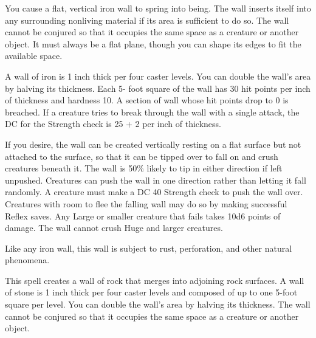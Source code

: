 \begin{multicols}{2}
\begin{small}
\noindent You cause a flat, vertical iron wall to spring into being. The wall inserts itself into any surrounding nonliving material if its area is sufficient to do so. The wall cannot be conjured so that it occupies the same space as a creature or another object. It must always be a flat plane, though you can shape its edges to fit the available space.

\smallskip\noindent A wall of iron is 1 inch thick per four caster levels. You can double the wall's area by halving its thickness. Each 5- foot square of the wall has 30 hit points per inch of thickness and hardness 10. A section of wall whose hit points drop to 0 is breached. If a creature tries to break through the wall with a single attack, the DC for the Strength check is 25 + 2 per inch of thickness.

\smallskip\noindent If you desire, the wall can be created vertically resting on a flat surface but not attached to the surface, so that it can be tipped over to fall on and crush creatures beneath it. The wall is 50\% likely to tip in either direction if left unpushed. Creatures can push the wall in one direction rather than letting it fall randomly. A creature must make a DC 40 Strength check to push the wall over. Creatures with room to flee the falling wall may do so by making successful Reflex saves. Any Large or smaller creature that fails takes 10d6 points of damage. The wall cannot crush Huge and larger creatures.

\smallskip\noindent Like any iron wall, this wall is subject to rust, perforation, and other natural phenomena.


\noindent This spell creates a wall of rock that merges into adjoining rock surfaces. A wall of stone is 1 inch thick per four caster levels and composed of up to one 5-foot square per level. You can double the wall's area by halving its thickness. The wall cannot be conjured so that it occupies the same space as a creature or another object.


\end{small}
\end{multicols}
